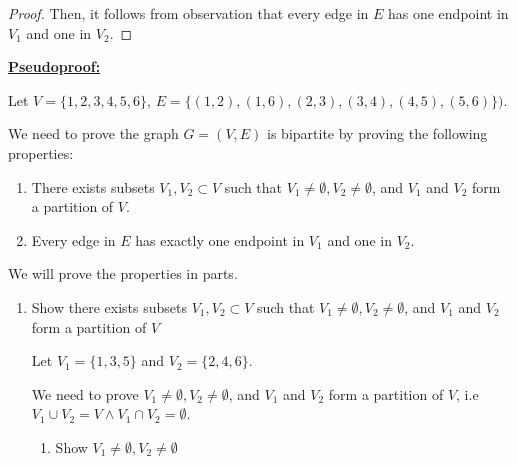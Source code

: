 \documentclass[12pt]{article}
\begin{document}
\begin{enumerate}[a.]
\begin{proof}
    \bigskip

    Then, it follows from observation that every edge in $E$ has
    one endpoint in $V_1$ and one in $V_2$.

    \end{proof}

    \bigskip

    \begin{mdframed}
        \underline{\textbf{Pseudoproof:}}

        \bigskip

        Let $V = \{1,2,3,4,5,6\}$, $E = \{(1,2),(1,6),(2,3),(3,4),(4,5),(5,6)\})$.

        \bigskip

        We need to prove the graph $G = (V,E)$ is bipartite by proving the following
        properties:

        \begin{enumerate}[1.]
            \item There exists subsets $V_1, V_2 \subset V$ such that
            $V_1 \neq \emptyset, V_2 \neq \emptyset$, and $V_1$ and $V_2$ form
            a partition of $V$.
            \item Every edge in $E$ has exactly one endpoint in $V_1$ and one in $V_2$.
        \end{enumerate}

        \bigskip

        We will prove the properties in parts.

        \bigskip

        \begin{enumerate}[1.]
            \item Show there exists subsets $V_1, V_2 \subset V$ such that
            $V_1 \neq \emptyset, V_2 \neq \emptyset$, and $V_1$ and $V_2$ form
            a partition of $V$

            \bigskip

            Let $V_1 = \{1,3,5\}$ and $V_2 = \{2,4,6\}$.

            \bigskip

            We need to prove $V_1 \neq \emptyset, V_2 \neq \emptyset$, and
            $V_1$ and $V_2$ form a partition of $V$, i.e $V_1 \cup V_2 = V
            \land V_1 \cap V_2 = \emptyset$.

            \bigskip

            \begin{enumerate}[1.]
                \item Show $V_1 \neq \emptyset, V_2 \neq \emptyset$


\end{enumerate}
\end{enumerate}
\end{mdframed}
\end{enumerate}
\end{document}
